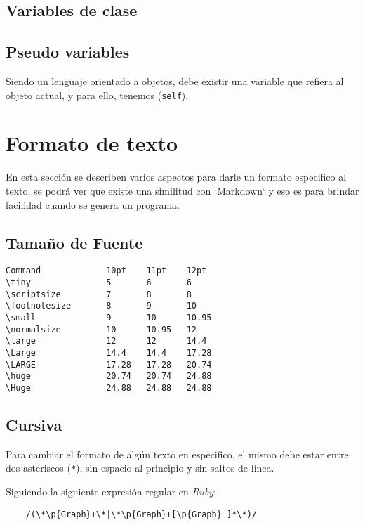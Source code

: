 \documentclass[12pt,letterpaper,titlepage,oneside,openright]{book}
\newcommand{\ruby}{\textit{Ruby}\xspace}
\newcommand{\ttcode}[1]{(\texttt{#1})}
\begin{document}
\subsection{Variables de clase}


\subsection{Pseudo variables}

Siendo un lenguaje orientado a objetos, debe existir una variable que refiera al
objeto actual, y para ello, tenemos \ttcode{self}.

\section{Formato de texto}

En esta sección se describen varios aspectos para darle un formato especifico al
texto, se podrá ver que existe una similitud con `Markdown` y eso es para
brindar facilidad cuando se genera un programa.

\subsection{Tamaño de Fuente}

\begin{verbatim}
Command             10pt    11pt    12pt
\tiny               5       6       6
\scriptsize         7       8       8
\footnotesize       8       9       10
\small              9       10      10.95
\normalsize         10      10.95   12
\large              12      12      14.4
\Large              14.4    14.4    17.28
\LARGE              17.28   17.28   20.74
\huge               20.74   20.74   24.88
\Huge               24.88   24.88   24.88
\end{verbatim}

\subsection{Cursiva}

Para cambiar el formato de algún texto en especifico, el mismo debe estar entre
dos asteriscos \ttcode{*}, sin espacio al principio y sin saltos de linea.

Siguiendo la siguiente expresión regular en \ruby:

\begin{center}
\begin{verbatim}
    /(\*\p{Graph}+\*|\*\p{Graph}+[\p{Graph} ]*\*)/
\end{verbatim}
\end{center}
\end{document}
